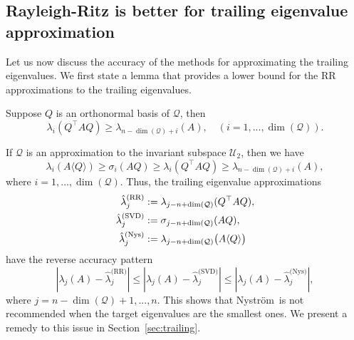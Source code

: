 \documentclass[onefignum,onetabnum]{siamart251216}
\def\subspace{\mathcal{Q}}
\def\Nystrom{Nystr{\"o}m}
\def\trailingsubspace{\mathcal{U}_2}
\begin{document}
\subsection{Rayleigh-Ritz is better for trailing eigenvalue approximation}
Let us now discuss the accuracy of the methods for approximating the trailing eigenvalues. We first state a lemma that provides a lower bound for the RR approximations to the trailing eigenvalues.
\begin{lemma}
    \label{lemma:exact-vs-apprximate-eigenvalue-small}
    Suppose $Q$ is an orthonormal basis of $\subspace$, then
    \begin{equation}
        \lambda_i(Q^\top A Q) \geq \lambda_{n - \dim(\subspace) + i}(A), \quad (i = 1, ..., \dim(\subspace)).
    \end{equation}
\end{lemma}
If $\subspace$ is an approximation to the invariant subspace $\trailingsubspace$, then we have
\begin{equation}
    \lambda_i(A \langle Q \rangle) \geq \sigma_i(AQ) \geq \lambda_i(Q^\top A Q) \geq \lambda_{n - \dim(\subspace) + i}(A),
\end{equation}
where $i = 1, ..., \dim(\subspace)$. Thus, the trailing eigenvalue approximations 
\begin{align}
\hat{\lambda}_{j}^{\text{\rm(RR)}} &:= \lambda_{j - n + \dim(\subspace)}(Q^\top A Q), \nonumber \\
\hat{\lambda}_{j}^{\text{\rm(SVD)}} &:= \sigma_{j - n + \dim(\subspace)}(A Q), \nonumber \\
\hat{\lambda}_{j}^{\text{\rm(Nys)}} &:= \lambda_{j - n + \dim(\subspace)}\bigl(A \langle Q \rangle\bigr) \nonumber
\end{align}
have the reverse accuracy pattern
\begin{equation}
    \label{eq:smallest-eigenvalue-accuracy-relation}
    \left| \lambda_{j}(A) - \hat{\lambda}_{j}^{\text{(RR)}}\right| 
    \leq
    \left| \lambda_{j}(A) - \hat{\lambda}_{j}^{\text{(SVD)}}\right|
    \leq
    \left| \lambda_{j}(A) - \hat{\lambda}_{j}^{\text{(Nys)}}\right|,
\end{equation}
where $j = n-\dim(\subspace)+1, ..., n$. This shows that \Nystrom\  is not recommended when the target eigenvalues are the smallest ones. We present a remedy to this issue in Section~\ref{sec:trailing}. 
\end{document}
